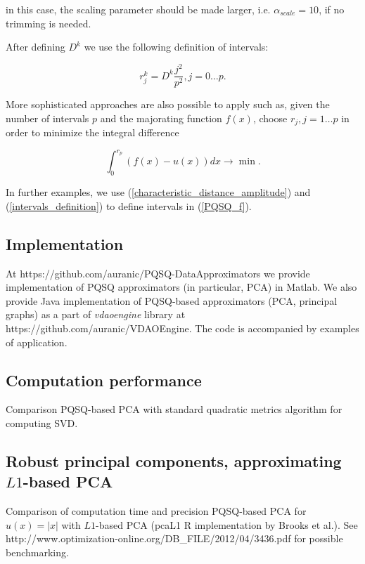 \documentclass[preprint,12pt]{elsarticle}
\begin{document}
\noindent in this case, the scaling parameter should be made larger, i.e. $\alpha_{scale}=10$, if no trimming is needed.

After defining $D^k$ we use the following definition of intervals:

\begin{equation}\label{intervals_definition}
r_j^k = D^k\frac{j^2}{p^2}, j=0\dots p.
\end{equation}

More sophisticated approaches are also possible to apply such as, given the number of intervals $p$ and the majorating function $f(x)$, choose $r_j, j=1\dots p$ in order to minimize the integral difference

$$
\int_0^{r_p}(f(x)-u(x))dx \rightarrow \min.
$$

In further examples, we use (\ref{characteristic_distance_amplitude}) and (\ref{intervals_definition}) to define intervals in (\ref{PQSQ_f}).

\subsection{Implementation}

At https://github.com/auranic/PQSQ-DataApproximators we provide implementation of PQSQ approximators (in particular, PCA) in Matlab. We also provide Java implementation of PQSQ-based approximators (PCA, principal graphs) as a part of \emph{vdaoengine} library at https://github.com/auranic/VDAOEngine. The code is accompanied by examples of application.




\subsection{Computation performance}

Comparison PQSQ-based PCA with standard quadratic metrics algorithm for computing SVD.

\subsection{Robust principal components, approximating $L1$-based PCA}

Comparison of computation time and precision PQSQ-based PCA for $u(x)=|x|$ with $L1$-based PCA (pcaL1 R implementation by Brooks et al.). See
http://www.optimization-online.org/DB\_FILE/2012/04/3436.pdf for possible benchmarking.
\end{document}
